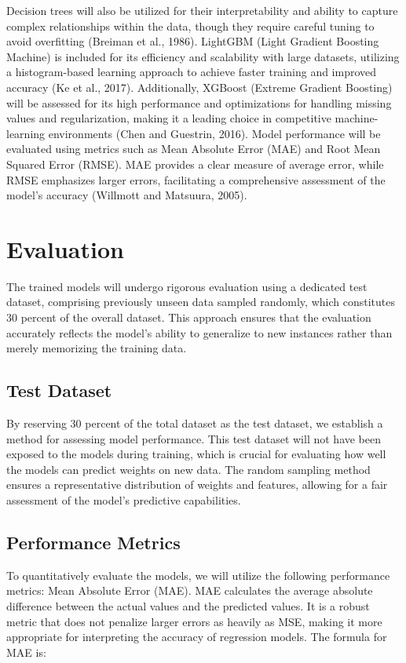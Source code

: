{Decision trees will also be utilized for their interpretability and ability to capture complex relationships within the data, though they require careful tuning to avoid overfitting (Breiman et al., 1986). LightGBM (Light Gradient Boosting Machine) is included for its efficiency and scalability with large datasets, utilizing a histogram-based learning approach to achieve faster training and improved accuracy (Ke et al., 2017). Additionally, XGBoost (Extreme Gradient Boosting) will be assessed for its high performance and optimizations for handling missing values and regularization, making it a leading choice in competitive machine-learning environments (Chen and Guestrin, 2016).
Model performance will be evaluated using metrics such as Mean Absolute Error (MAE) and Root Mean Squared Error (RMSE). MAE provides a clear measure of average error, while RMSE emphasizes larger errors, facilitating a comprehensive assessment of the model's accuracy (Willmott and Matsuura, 2005).

\section{Evaluation}
The trained models will undergo rigorous evaluation using a dedicated test dataset, comprising previously unseen data sampled randomly, which constitutes 30 percent of the overall dataset. This approach ensures that the evaluation accurately reflects the model's ability to generalize to new instances rather than merely memorizing the training data.
\subsection{Test Dataset}
By reserving 30 percent of the total dataset as the test dataset, we establish a method for assessing model performance. This test dataset will not have been exposed to the models during training, which is crucial for evaluating how well the models can predict weights on new data. The random sampling method ensures a representative distribution of weights and features, allowing for a fair assessment of the model's predictive capabilities.

\subsection{Performance Metrics}

To quantitatively evaluate the models, we will utilize the following performance metrics:
Mean Absolute Error (MAE). MAE calculates the average absolute difference between the actual values and the predicted values. It is a robust metric that does not penalize larger errors as heavily as MSE, making it more appropriate for interpreting the accuracy of regression models. The formula for MAE is:

}

